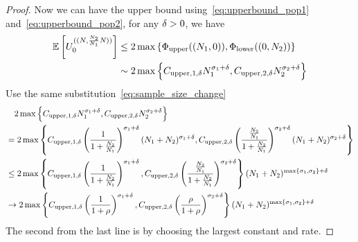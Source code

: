 \begin{proof}
Now we can have the upper bound using~\cref{eq:upperbound_pop1} and~\cref{eq:upperbound_pop2}, for any $\delta>0$, we have
\begin{align*}
    \E\left[\news{\bm{0}}{(\samplesize{},\frac{\samplesize{2}}{\samplesize{1}}\samplesize{})}\right]& \le2\max\left\{\upperbound((\samplesize{1},0)),\lowerbound((0,\samplesize{2}))\right\} \\
    &\sim 2\max\left\{ \constantupper{1} \samplesize{1}^{\rate{1}+\smallpositive}, \constantupper{2}\samplesize{2}^{\rate{2}+\smallpositive}  \right\}
\end{align*}
Use the same substitution~\cref{eq:sample_size_change}
\begin{align*}
    &~~~2\max\left\{ C_{\mathrm{upper},1,\delta} N_{1}^{\sigma_{1}+\delta}, C_{\mathrm{upper},2,\delta}N_{2}^{\sigma_{2}+\delta}  \right\}\\
    &=2\max\left\{  C_{\mathrm{upper},1,\delta}\left(\frac{1}{1+\frac{N_{2}}{N_{1}}}\right)^{\sigma_{1}+\delta} (N_{1}+N_{2})^{\sigma_{1}+\delta}, C_{\mathrm{upper},2,\delta}\left(\frac{\frac{N_{2}}{N_{1}}}{1+\frac{N_{2}}{N_{1}}}\right)^{\sigma_{2}+\delta}(N_{1}+N_{2})^{\sigma_{2}+\delta} \right\}\\
    &\le 2\max\left\{ C_{\mathrm{upper},1,\delta}\left(\frac{1}{1+\frac{N_{2}}{N_{1}}}\right)^{\sigma_{1}+\delta}, C_{\mathrm{upper},2,\delta}\left(\frac{\frac{N_{2}}{N_{1}}}{1+\frac{N_{2}}{N_{1}}}\right)^{\sigma_{2}+\delta} \right\}(N_{1}+N_{2})^{\max\left\{\sigma_{1},\sigma_{2}\right\}+\delta}\\
    &\to 2\max\left\{ C_{\mathrm{upper},1,\delta}\left(\frac{1}{1+\rho}\right)^{\sigma_{1}+\delta}, C_{\mathrm{upper},2,\delta}\left(\frac{\rho}{1+\rho}\right)^{\sigma_{2}+\delta} \right\}(N_{1}+N_{2})^{\max\left\{\sigma_{1},\sigma_{2}\right\}+\delta}
\end{align*}
The second from the last line is by choosing the largest constant and rate. 


\end{proof}
